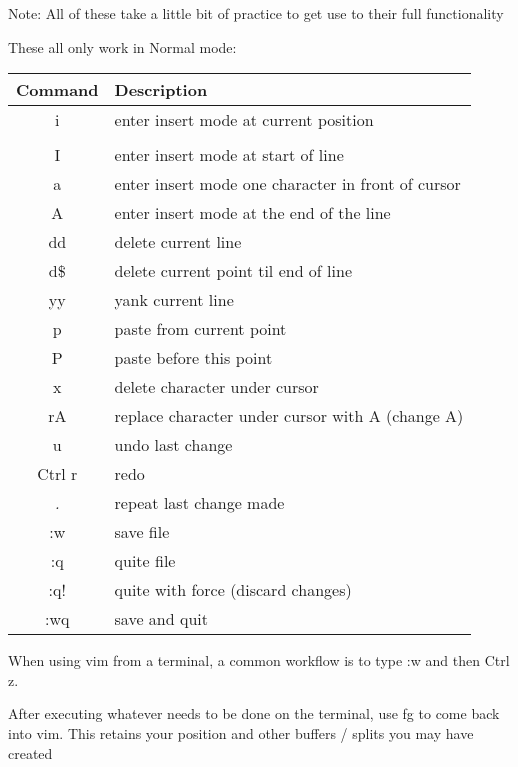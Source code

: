 \documentclass[12pt, letterpaper]{article}
\begin{document}
Note: All of these take a little bit of practice to get use to their full functionality

These all only work in Normal mode:

\begin{table}[H]
    \begin{tabular}{|c|p{9cm}|}
        Command & Description \\
        \hline
        i & enter insert mode at current position \\
        \hline \\
        I & enter insert mode at start of line \\
        \hline
        a & enter insert mode one character in front of cursor \\
        \hline
        A & enter insert mode at the end of the line \\
        \hline
        dd & delete current line \\
        \hline
        d\$ & delete current point til end of line \\
        \hline
        yy & yank current line \\
        \hline
        p & paste from current point \\
        \hline
        P & paste before this point \\
        \hline
        x & delete character under cursor \\
        \hline
        rA & replace character under cursor with A (change A) \\
        \hline
        u & undo last change \\
        \hline
        Ctrl r & redo  \\
        \hline
        \textit{.} & repeat last change made  \\
        \hline
        :w & save file \\
        \hline
        :q & quite file \\
        \hline
        :q! & quite with force (discard changes) \\
        \hline
        :wq & save and quit \\
        \hline
    \end{tabular}
\end{table}

When using vim from a terminal, a common workflow is to type :w and then Ctrl z.

After executing whatever needs to be done on the terminal, use fg to come back into vim. This retains your position and other buffers / splits you may have created
\end{document}
